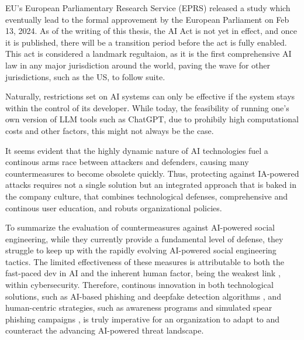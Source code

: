 EU's European Parliamentary Research Service (EPRS) released a study\citep{eprsTheImpactofTheGDPR2020} which eventually lead to the formal approvement by the European Parliament on Feb 13, 2024. As of the writing of this thesis, the AI Act is not yet in effect, and once it is published, there will be a transition period before the act is fully enabled. This act is considered a landmark regultaion, as it is the first comprehensive AI law in any major jurisdiction around the world, paving the wave for other jurisdictions, such as the US,  to follow suite.

Naturally, restrictions set on AI systems can only be effective if the system stays within the control of its developer.  While today, the feasibility of running one's own version of LLM tools such as ChatGPT, due to prohibily high computational costs and other factors, this might not always be the case.

It seems evident that the highly dynamic nature of AI technologies fuel a continous arms race between attackers and defenders, causing many countermeasures to become obsolete quickly. Thus, protecting against IA-powered attacks requires not a single solution but an integrated approach that is baked in the company culture, that combines technological defenses, comprehensive and continous user education, and robuts organizational policies.

To summarize the evaluation of countermeasures against AI-powered social engineering, while they currently provide a fundamental level of defense, they struggle to keep up with the rapidly evolving AI-powered social engineering tactics. The limited effectiveness of these measures is attributable to both the fast-paced dev in AI and the inherent human factor, being the weakest link \citep{mitnickArtDeceptionControlling2003}, within cybersecurity. Therefore, continous innovation in both technological solutions, such as AI-based phishing and deepfake detection algorithms \citep{mirskyTheCreationAndDetectionOfDeepfakes2021}, and human-centric strategies, such as awareness programs and simulated spear phishing campaigns \citep{salahdineSocialEngineeringAttacks2019}, is truly imperative for an organization to adapt to and counteract the advancing AI-powered threat landscape.
